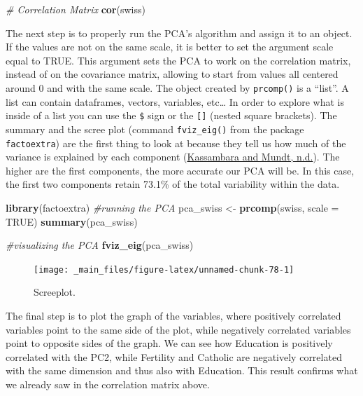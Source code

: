 \documentclass[
]{svmono}
\newenvironment{Shaded}{\begin{snugshade}}{\end{snugshade}}
\newcommand{\AttributeTok}[1]{\textcolor[rgb]{0.13,0.29,0.53}{#1}}
\newcommand{\CommentTok}[1]{\textcolor[rgb]{0.56,0.35,0.01}{\textit{#1}}}
\newcommand{\ConstantTok}[1]{\textcolor[rgb]{0.56,0.35,0.01}{#1}}
\newcommand{\FunctionTok}[1]{\textcolor[rgb]{0.13,0.29,0.53}{\textbf{#1}}}
\newcommand{\NormalTok}[1]{#1}
\newcommand{\OtherTok}[1]{\textcolor[rgb]{0.56,0.35,0.01}{#1}}
\begin{document}
\begin{Shaded}
\begin{Highlighting}[]
\CommentTok{\# Correlation Matrix}
\FunctionTok{cor}\NormalTok{(swiss)}
\end{Highlighting}
\end{Shaded}

The next step is to properly run the PCA's algorithm and assign it to an
object. If the values are not on the same scale, it is better to set the
argument scale equal to TRUE. This argument sets the PCA to work on the
correlation matrix, instead of on the covariance matrix, allowing to
start from values all centered around 0 and with the same scale. The
object created by \texttt{prcomp()} is a ``list''. A list can contain dataframes,
vectors, variables, etc\ldots{} In order to explore what is inside of a list
you can use the \texttt{\$} sign or the \texttt{{[}{]}} (nested square brackets). The
summary and the scree plot (command \texttt{fviz\_eig()} from the package
\texttt{factoextra}) are the first thing to look at because they tell us how
much of the variance is explained by each component (\protect\hyperlink{ref-kassambara}{Kassambara and Mundt, n.d.}). The
higher are the first components, the more accurate our PCA will be. In
this case, the first two components retain 73.1\% of the total
variability within the data.

\begin{Shaded}
\begin{Highlighting}[]
\FunctionTok{library}\NormalTok{(factoextra)}
\CommentTok{\#running the PCA}
\NormalTok{pca\_swiss }\OtherTok{\textless{}{-}} \FunctionTok{prcomp}\NormalTok{(swiss, }\AttributeTok{scale =} \ConstantTok{TRUE}\NormalTok{)}
\FunctionTok{summary}\NormalTok{(pca\_swiss)}

\CommentTok{\#visualizing the PCA}
\FunctionTok{fviz\_eig}\NormalTok{(pca\_swiss)}
\end{Highlighting}
\end{Shaded}

\begin{figure}[H]

{\centering \texttt{[image: \_main\_files/figure-latex/unnamed-chunk-78-1]} 

}

\caption{Screeplot.}\label{fig:unnamed-chunk-78}
\end{figure}

The final step is to plot the graph of the variables, where positively
correlated variables point to the same side of the plot, while
negatively correlated variables point to opposite sides of the graph. We
can see how Education is positively correlated with the PC2, while
Fertility and Catholic are negatively correlated with the same dimension
and thus also with Education. This result confirms what we already saw
in the correlation matrix above.
\end{document}
